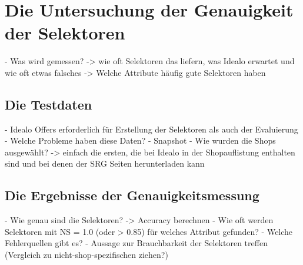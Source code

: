 \section{Die Untersuchung der Genauigkeit der Selektoren}

	- Was wird gemessen?
		 -> wie oft Selektoren das liefern, was Idealo erwartet und wie oft etwas falsches
		 -> Welche Attribute häufig gute Selektoren haben
	
\subsection{Die Testdaten}

	- Idealo Offers erforderlich für Erstellung der Selektoren als auch der Evaluierung
	- Welche Probleme haben diese Daten?
	- Snapshot
	- Wie wurden die Shops ausgewählt? -> einfach die ersten, die bei Idealo in der Shopauflistung enthalten sind und bei denen der SRG Seiten herunterladen kann
	
\subsection{Die Ergebnisse der Genauigkeitsmessung}

	- Wie genau sind die Selektoren? -> Accuracy berechnen
	- Wie oft werden Selektoren mit NS = 1.0 (oder > 0.85) für welches Attribut gefunden?
	- Welche Fehlerquellen gibt es?
	- Aussage zur Brauchbarkeit der Selektoren treffen (Vergleich zu nicht-shop-spezifischen ziehen?)
